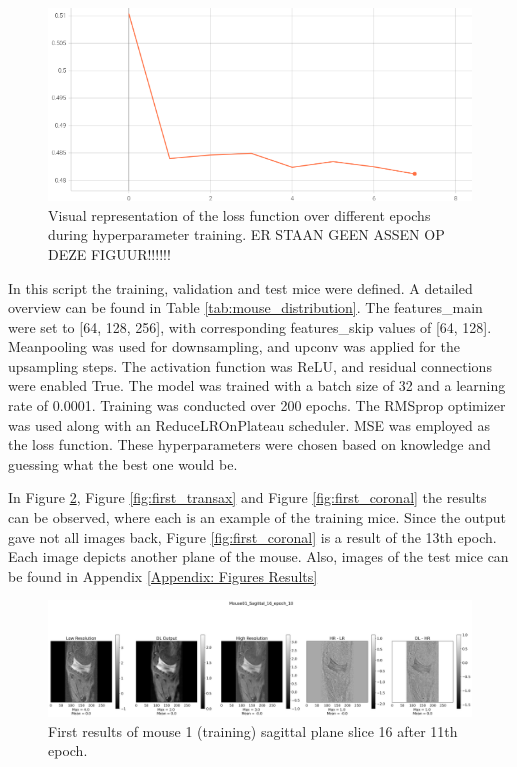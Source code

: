 \documentclass[twocolumn]{article}
\begin{document}
\begin{figure}
    \centering
    \includegraphics[width=1\linewidth]{First_results_loss.png}
    \caption{Visual representation of the loss function over different epochs during hyperparameter training. ER STAAN GEEN ASSEN OP DEZE FIGUUR!!!!!!}
    \label{fig:first_loss}
\end{figure}

In this script the training, validation and test mice were defined. A detailed overview can be found in Table \ref{tab:mouse_distribution}.
The features\_main were set to [64, 128, 256], with corresponding features\_skip values of [64, 128]. 
Meanpooling was used for downsampling, and upconv was applied for the upsampling steps. 
The activation function was ReLU, and residual connections were enabled True.
The model was trained with a batch size of 32 and a learning rate of 0.0001. Training was conducted over 200 epochs. 
The RMSprop optimizer was used along with an ReduceLROnPlateau scheduler. MSE was employed as the loss function.
These hyperparameters were chosen based on knowledge and guessing what the best one would be.

In Figure \ref{fig:first_sagittal}, Figure \ref{fig:first_transax} and Figure \ref{fig:first_coronal} the results can be observed, where each is an example of the training mice. 
Since the output gave not all images back, Figure \ref{fig:first_coronal} is a result of the 13th epoch.
Each image depicts another plane of the mouse. Also, images of the test mice can be found in Appendix \ref{Appendix: Figures Results}

\begin{figure}
    \centering
    \includegraphics[width=1\linewidth]{Mouse01_Sagittal_16_epoch_10.png}
    \caption{First results of mouse 1 (training) sagittal plane slice 16 after 11th epoch.}
    \label{fig:first_sagittal}
\end{figure}
\end{document}
